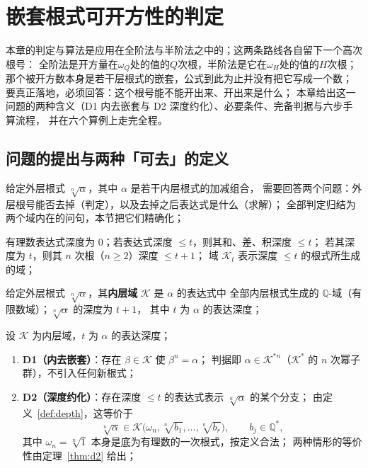 \documentclass[UTF8,a4paper,11pt]{ctexart}
\begin{document}
\section{嵌套根式可开方性的判定}
本章的判定与算法是应用在全阶法与半阶法之中的；这两条路线各自留下一个高次根号：
全阶法是开方量在$\omega_Q$处的值的$Q$次根，半阶法是它在$\omega_H$处的值的$H$次根；
那个被开方数本身是若干层根式的嵌套，公式到此为止并没有把它写成一个数；
要真正落地，必须回答：这个根号能不能开出来、开出来是什么；
本章给出这一问题的两种含义（D1 内去嵌套与 D2 深度约化）、必要条件、完备判据与六步手算流程，
并在六个算例上走完全程。

\subsection{问题的提出与两种「可去」的定义}
\label{sec:d1d2}

给定外层根式 $\sqrt[n]{\alpha}$，其中 $\alpha$ 是若干内层根式的加减组合，
需要回答两个问题：外层根号能否去掉（判定），以及去掉之后表达式是什么（求解）；
全部判定归结为两个域内在的问句，本节把它们精确化；\par

\begin{definition}[根式表达式与深度]
\label{def:depth}
有理数表达式深度为 $0$；若表达式深度 $\le t$，则其和、差、积深度 $\le t$；
若其深度为 $t$，则其 $n$ 次根（$n\ge2$）深度 $\le t+1$；
域 $\mathscr{K}_t$ 表示深度 $\le t$ 的根式所生成的域；
\end{definition}

\begin{definition}[内层域]
\label{def:inner}
给定外层根式 $\sqrt[n]{\alpha}$，其\textbf{内层域} $\mathscr{K}$ 是 $\alpha$ 的表达式中
全部内层根式生成的 $\mathbb{Q}$-域（有限数域）；$\sqrt[n]{\alpha}$ 的深度为 $t+1$，
其中 $t$ 为 $\alpha$ 的表达深度；
\end{definition}

\begin{definition}[两种去嵌套]
\label{def:two}
设 $\mathscr{K}$ 为内层域，$t$ 为 $\alpha$ 的表达深度；
\begin{enumerate}
\item \textbf{D1（内去嵌套）}：存在 $\beta\in\mathscr{K}$ 使 $\beta^n=\alpha$；
判据即 $\alpha\in\mathscr{K}^{*n}$（$\mathscr{K}^*$ 的 $n$ 次幂子群），不引入任何新根式；
\item \textbf{D2（深度约化）}：存在深度 $\le t$ 的表达式表示 $\sqrt[n]{\alpha}$ 的某个分支；
由定义~\ref{def:depth}，这等价于
\[
\sqrt[n]{\alpha}\in\mathscr{K}\bigl(\omega_n,\sqrt[n]{b_1},\dots,\sqrt[n]{b_r}\bigr),
\qquad b_j\in\mathbb{Q}^*,
\]
其中 $\omega_n=\sqrt[n]{1}$ 本身是底为有理数的一次根式，按定义合法；
两种情形的等价性由定理~\ref{thm:d2} 给出；
\end{enumerate}
\end{definition}
\end{document}
